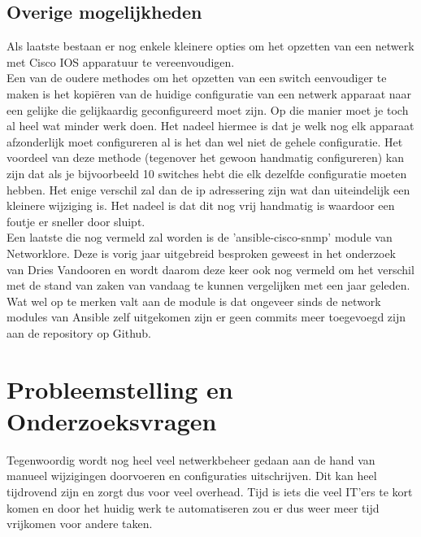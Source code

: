 \subsection{Overige mogelijkheden}
\label{sec:overige}
Als laatste bestaan er nog enkele kleinere opties om het opzetten van een netwerk met Cisco IOS apparatuur te vereenvoudigen. 
\\

Een van de oudere methodes om het opzetten van een switch eenvoudiger te maken is het kopiëren van de huidige configuratie van een netwerk apparaat naar een gelijke die gelijkaardig geconfigureerd moet zijn. Op die manier moet je toch al heel wat minder werk doen. Het nadeel hiermee is dat je welk nog elk apparaat afzonderlijk moet configureren al is het dan wel niet de gehele configuratie. Het voordeel van deze methode (tegenover het gewoon handmatig configureren) kan zijn dat als je bijvoorbeeld 10 switches hebt die elk dezelfde configuratie moeten hebben. Het enige verschil zal dan de ip adressering zijn wat dan uiteindelijk een kleinere wijziging is. Het nadeel is dat dit nog vrij handmatig is waardoor een foutje er sneller door sluipt.
\\

Een laatste die nog vermeld zal worden is de 'ansible-cisco-snmp' module van Networklore. Deze is vorig jaar uitgebreid besproken geweest in het onderzoek van Dries Vandooren en wordt daarom deze keer ook nog vermeld om het verschil met de stand van zaken van vandaag te kunnen vergelijken met een jaar geleden. Wat wel op te merken valt aan de module is dat ongeveer sinds de network modules van Ansible zelf uitgekomen zijn er geen commits meer toegevoegd zijn aan de repository op Github.\autocite{networkloreSnmpAnsible}


\section{Probleemstelling en Onderzoeksvragen}
\label{sec:onderzoeksvragen}
Tegenwoordig wordt nog heel veel netwerkbeheer gedaan aan de hand van manueel wijzigingen doorvoeren en configuraties uitschrijven. Dit kan heel tijdrovend zijn en zorgt dus voor veel overhead. Tijd is iets die veel IT'ers te kort komen en door het huidig werk te automatiseren zou er dus weer meer tijd vrijkomen voor andere taken.
\\

